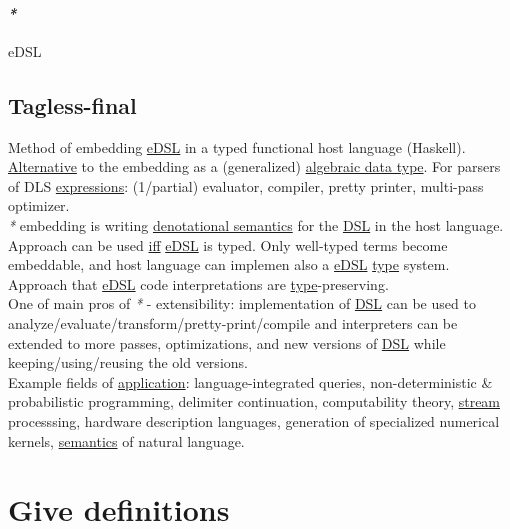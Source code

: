 \documentclass[a4paper,14pt,oneside]{book}
\begin{document}
\subsection{\emph{*}}
\label{sec:org597ac52}

\label{orgbbfaaec}eDSL\\

\chapter{\label{orge3300cf}Tagless-final}
\label{sec:org0bc792d}
Method of embedding \hyperref[orgbbfaaec]{eDSL} in a typed functional host language (Haskell). \hyperref[orge6e5c4c]{Alternative} to the embedding as a (generalized) \hyperref[org4a96d49]{algebraic data type}. For parsers of DLS \hyperref[org907bfe3]{expressions}: (1/partial) evaluator, compiler, pretty printer, multi-pass optimizer.\\

\emph{*} embedding is writing \hyperref[org725be21]{denotational semantics} for the \hyperref[orgefeb256]{DSL} in the host language.\\

Approach can be used \hyperref[org2ebae45]{iff} \hyperref[orgbbfaaec]{eDSL} is typed. Only well-typed terms become embeddable, and host language can implemen also a \hyperref[orgbbfaaec]{eDSL} \hyperref[org35b9249]{type} system. Approach that \hyperref[orgbbfaaec]{eDSL} code interpretations are \hyperref[org35b9249]{type}-preserving.\\

One of main pros of \emph{*} - extensibility: implementation of \hyperref[orgefeb256]{DSL} can be used to analyze/evaluate/transform/pretty-print/compile and interpreters can be extended to more passes, optimizations, and new versions of \hyperref[orgefeb256]{DSL} while keeping/using/reusing the old versions.\\

Example fields of \hyperref[orgf3301f1]{application}: language-integrated queries, non-deterministic \& probabilistic programming, delimiter continuation, computability theory, \hyperref[orgd13f55a]{stream} processsing, hardware description languages, generation of specialized numerical kernels, \hyperref[org7f4fabd]{semantics} of natural language.\\

\part{Give definitions}
\label{sec:org0f644de}
\end{document}

